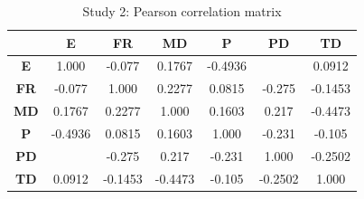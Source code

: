 \documentclass[thesis]{fputhesis}
\newcommand{\ra}[1]{\renewcommand{\arraystretch}{#1}}
\begin{document}
\begin{body}
\begin{table}[h]\centering
\caption{Study 2: Pearson correlation matrix}\label{tab:correlation2}
\ra{1.2}
    \begin{tabular}{@{}c *{6}{S[table-format=1.4]} @{}}
        \toprule
                 & {\textbf{E}} & {\textbf{FR}} & {\textbf{MD}} & {\textbf{P}} & {\textbf{PD}} & {\textbf{TD}}\\
        \midrule
            \textbf{E}  &   1.000   &   -0.077  &   0.1767  &   -0.4936 &    &   0.0912  \\
            \textbf{FR} &  -0.077   &    1.000  &   0.2277  &    0.0815 &  -0.275   &   -0.1453 \\
            \textbf{MD} &   0.1767  &    0.2277 &   1.000   &    0.1603 &   0.217   &   -0.4473 \\
            \textbf{P}  &  -0.4936  &    0.0815 &   0.1603  &    1.000  &  -0.231   &   -0.105  \\
            \textbf{PD} &    &   -0.275  &   0.217   &   -0.231  &   1.000   &   -0.2502 \\
            \textbf{TD} &   0.0912  &   -0.1453 &  -0.4473  &   -0.105  &  -0.2502  &    1.000  \\ 
        \bottomrule
    \end{tabular}
\end{table}


\end{body}
\end{document}
